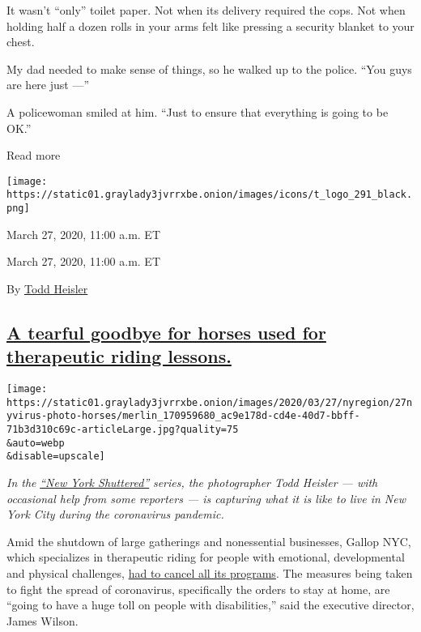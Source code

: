 It wasn't ``only'' toilet paper. Not when its delivery required the
cops. Not when holding half a dozen rolls in your arms felt like
pressing a security blanket to your chest.

My dad needed to make sense of things, so he walked up to the police.
``You guys are here just ---''

A policewoman smiled at him. ``Just to ensure that everything is going
to be OK.''

Read more

\texttt{[image: https://static01.graylady3jvrrxbe.onion/images/icons/t\_logo\_291\_black.png]}

March 27, 2020, 11:00 a.m. ET

March 27, 2020, 11:00 a.m. ET

By \href{https://www.nytimes3xbfgragh.onion/by/todd-heisler}{Todd
Heisler}

\hypertarget{a-tearful-goodbye-for-horses-used-for-therapeutic-riding-lessons}{%
\subsection{\texorpdfstring{\protect\hyperlink{a-tearful-goodbye-for-horses-used-for-therapeutic-riding-lessons}{A
tearful goodbye for horses used for therapeutic riding
lessons.}}{A tearful goodbye for horses used for therapeutic riding lessons.}}\label{a-tearful-goodbye-for-horses-used-for-therapeutic-riding-lessons}}

\texttt{[image: https://static01.graylady3jvrrxbe.onion/images/2020/03/27/nyregion/27nyvirus-photo-horses/merlin\_170959680\_ac9e178d-cd4e-40d7-bbff-71b3d310c69c-articleLarge.jpg?quality=75\\\&auto=webp\\\&disable=upscale]}

\emph{In the}
\href{https://www.nytimes3xbfgragh.onion/spotlight/new-york-shuttered}{\emph{``New
York Shuttered''}} \emph{series, the photographer Todd Heisler --- with
occasional help from some reporters --- is capturing what it is like to
live in New York City during the coronavirus pandemic.}

Amid the shutdown of large gatherings and nonessential businesses,
Gallop NYC, which specializes in therapeutic riding for people with
emotional, developmental and physical challenges,
\href{https://www.nytimes3xbfgragh.onion/2020/03/27/nyregion/queens-horses-coronavirus.html}{had
to cancel all its programs}. The measures being taken to fight the
spread of coronavirus, specifically the orders to stay at home, are
``going to have a huge toll on people with disabilities,'' said the
executive director, James Wilson.


